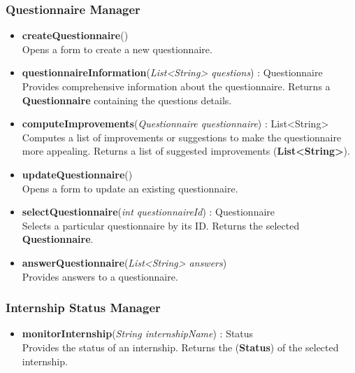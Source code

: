 \subsubsection*{Questionnaire Manager}
\begin{itemize}

    \item \textbf{createQuestionnaire}() \\
    Opens a form to create a new questionnaire.

    \item \textbf{questionnaireInformation}(\textit{List<String> questions}) : Questionnaire \\
    Provides comprehensive information about the questionnaire.  
    Returns a \textbf{Questionnaire} containing the questions details.

    \item \textbf{computeImprovements}(\textit{Questionnaire questionnaire}) : List<String> \\
    Computes a list of improvements or suggestions to make the questionnaire more appealing.  
    Returns a list of suggested improvements (\textbf{List<String>}).

    \item \textbf{updateQuestionnaire}() \\
    Opens a form to update an existing questionnaire.

    \item \textbf{selectQuestionnaire}(\textit{int questionnaireId}) : Questionnaire \\
    Selects a particular questionnaire by its ID.  
    Returns the selected \textbf{Questionnaire}.

    \item \textbf{answerQuestionnaire}(\textit{List<String> answers}) \\
    Provides answers to a questionnaire.

\end{itemize}

\subsubsection*{Internship Status Manager}
\begin{itemize}

    \item \textbf{monitorInternship}(\textit{String internshipName}) : Status \\
    Provides the status of an internship.  
    Returns the (\textbf{Status}) of the selected internship.

\end{itemize}

